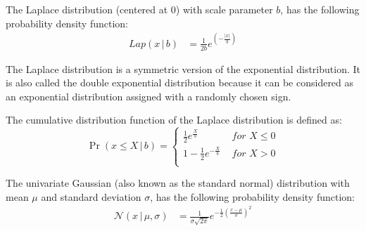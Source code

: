 \begin{definition}
    \label{def:LaplaceDistribution}
    The Laplace distribution (centered at $0$) with scale parameter $b$, has the following probability density function:
    \begin{equation}
        \begin{split}
            Lap\left(x \,|\,b\right)&= \frac{1}{2b}e^{\left( -\frac{\left| x\right| }{b}\right)}
        \end{split}
    \end{equation}
\end{definition}
The Laplace distribution is a symmetric version of the exponential distribution. It is also called the double exponential distribution because it can be considered as an exponential distribution assigned with a randomly chosen sign.

The cumulative distribution function of the Laplace distribution is defined as:
\begin{equation}
    \Pr\left( x\leq X\,|\,b\right)=
    \begin{cases}
        \frac{1}{2} e^{\frac{X}{b}}     & \textit{ for } X \leq 0 \\
        1- \frac{1}{2} e^{-\frac{X}{b}} & \textit{ for } X > 0    \\
    \end{cases}
\end{equation}


\begin{definition}
    \label{def:GaussianDistribution}
    The univariate Gaussian (also known as the standard normal) distribution with mean $\mu$ and standard deviation $\sigma$, has the following probability density function:
    \begin{equation}
        \begin{split}
            \mathcal{N} \left( x \,|\, \mu,\sigma\right)&=\frac{1}{\sigma\sqrt{2 \pi}}e^{-\frac{1}{2}\left( \frac{x-\mu}{\sigma}\right) ^{2}}
        \end{split}
    \end{equation}
\end{definition}



